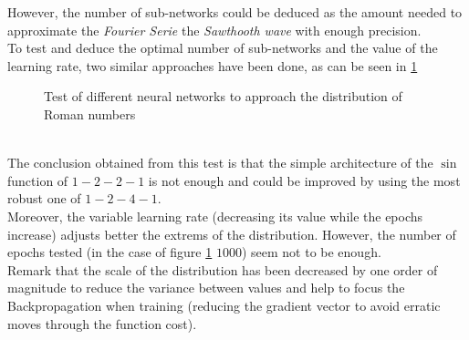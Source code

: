 \documentclass[a4paper, 11pt]{article}
\begin{document}
However, the number of sub-networks could be deduced as the amount needed to approximate the \textit{Fourier Serie} the \textit{Sawthooth wave} with enough precision.\\
To test and deduce the optimal number of sub-networks and the value of the learning rate, two similar approaches have been done, as can be seen in \ref{first-approach}
\begin{figure}[h]
    \centering
    \hspace{1em}
    \caption{Test of different neural networks to approach the distribution of Roman numbers}
    \label{first-approach}
\end{figure}\\
The conclusion obtained from this test is that the simple architecture of the $\sin$ function of $1-2-2-1$ is not enough and could be improved by using the most robust one of $1-2-4-1$.\\
Moreover, the variable learning rate (decreasing its value while the epochs increase) adjusts better the extrems of the distribution. However, the number of epochs tested (in the case of figure \ref{first-approach} $1000$) seem not to be enough.\\
Remark that the scale of the distribution has been decreased by one order of magnitude to reduce the variance between values and help to focus the Backpropagation when training (reducing the gradient vector to avoid erratic moves through the function cost).
\end{document}
